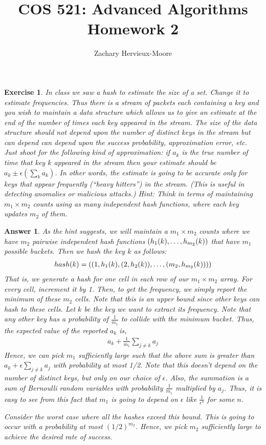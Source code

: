 \documentclass[12pt]{article}
\title{COS 521: Advanced Algorithms \\ Homework 2}
\author{Zachary Hervieux-Moore}
\date{\displaydate{date}}
\theoremstyle{colon}
\newtheorem{exercise}{Exercise}
\newtheorem*{answer}{Answer}
\begin{document}
\maketitle

\clearpage

\begin{exercise}
  In class we saw a hash to estimate the size of a set. Change it to estimate frequencies. Thus there is a stream of packets each containing a \textit{key} and you wish to maintain a data structure which allows us to give an estimate at the end of the \textit{number of times} each key appeared in the stream. The size of the data structure should not depend upon the number of distinct keys in the stream but can depend can depend upon the success probability, approximation error, etc. Just shoot for the following kind of approximation: if $a_k$ is the true number of time that key $k$ appeared in the stream then your estimate should be $a_k \pm \epsilon (\sum_k a_k)$. In other words, the estimate is going to be accurate only for keys that appear frequently (``heavy hitters'') in the stream. (This is useful in detecting anomalies or malicious attacks.) Hint: Think in terms of maintaining $m_1 \times m_2$ counts using as many independent hash functions, where each key updates $m_2$ of them.
\end{exercise}

\begin{answer}
  As the hint suggests, we will maintain a $m_1 \times m_2$ counts where we have $m_2$ pairwise independent hash functions $(h_1(k),\mathellipsis, h_{m_2}(k))$ that have $m_1$ possible buckets. Then we hash the key $k$ as follows:
  \begin{gather*}
    hash(k) = \left( (1, h_1(k), (2, h_2(k)), \mathellipsis, (m_2, h_{m_2}(k)))  \right)
  \end{gather*}
  That is, we generate a hash for one cell in each row of our $m_1 \times m_2$ array. For every cell, increment it by 1. Then, to get the frequency, we simply report the minimum of these $m_2$ cells. Note that this is an upper bound since other keys can hash to these cells. Let $k$ be the key we want to extract its frequency. Note that any other key has a probability of $\frac{1}{m_1}$ to collide with the minimum bucket. Thus, the expected value of the reported $a_k$ is,
  \begin{gather*}
    a_k + \frac{1}{m_1} \sum_{j \neq k} a_j
  \end{gather*}
  Hence, we can pick $m_1$ sufficiently large such that the above sum is greater than $a_k + \epsilon \sum_{j \neq k} a_j$ with probability at most 1/2. Note that this doesn't depend on the number of distinct keys, but only on our choice of $\epsilon$. Also, the summation is a sum of Bernoulli random variables with probability $\frac{1}{m_1}$ multiplied by $a_j$. Thus, it is easy to see from this fact that $m_1$ is going to depend on $\epsilon$ like $\frac{1}{\epsilon^n}$ for some $n$.

  Consider the worst case where all the hashes exceed this bound. This is going to occur with a probability at most $(1/2)^{m_2}$. Hence, we pick $m_2$ sufficiently large to achieve the desired rate of success.
\end{answer}
\end{document}
